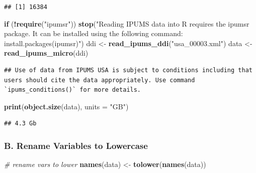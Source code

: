 \documentclass[
]{article}
\newenvironment{Shaded}{\begin{snugshade}}{\end{snugshade}}
\newcommand{\AttributeTok}[1]{\textcolor[rgb]{0.13,0.29,0.53}{#1}}
\newcommand{\CommentTok}[1]{\textcolor[rgb]{0.56,0.35,0.01}{\textit{#1}}}
\newcommand{\ControlFlowTok}[1]{\textcolor[rgb]{0.13,0.29,0.53}{\textbf{#1}}}
\newcommand{\FunctionTok}[1]{\textcolor[rgb]{0.13,0.29,0.53}{\textbf{#1}}}
\newcommand{\NormalTok}[1]{#1}
\newcommand{\OtherTok}[1]{\textcolor[rgb]{0.56,0.35,0.01}{#1}}
\newcommand{\SpecialCharTok}[1]{\textcolor[rgb]{0.81,0.36,0.00}{\textbf{#1}}}
\newcommand{\StringTok}[1]{\textcolor[rgb]{0.31,0.60,0.02}{#1}}
\begin{document}
\begin{verbatim}
## [1] 16384
\end{verbatim}

\begin{Shaded}
\begin{Highlighting}[]
\ControlFlowTok{if}\NormalTok{ (}\SpecialCharTok{!}\FunctionTok{require}\NormalTok{(}\StringTok{"ipumsr"}\NormalTok{)) }\FunctionTok{stop}\NormalTok{(}\StringTok{"Reading IPUMS data into R requires the ipumsr package. It can be installed using the following command: install.packages(\textquotesingle{}ipumsr\textquotesingle{})"}\NormalTok{)}
\NormalTok{ddi }\OtherTok{\textless{}{-}} \FunctionTok{read\_ipums\_ddi}\NormalTok{(}\StringTok{"usa\_00003.xml"}\NormalTok{)}
\NormalTok{data }\OtherTok{\textless{}{-}} \FunctionTok{read\_ipums\_micro}\NormalTok{(ddi)}
\end{Highlighting}
\end{Shaded}

\begin{verbatim}
## Use of data from IPUMS USA is subject to conditions including that users should cite the data appropriately. Use command `ipums_conditions()` for more details.
\end{verbatim}

\begin{Shaded}
\begin{Highlighting}[]
\FunctionTok{print}\NormalTok{(}\FunctionTok{object.size}\NormalTok{(data), }\AttributeTok{units =} \StringTok{"GB"}\NormalTok{)}
\end{Highlighting}
\end{Shaded}

\begin{verbatim}
## 4.3 Gb
\end{verbatim}

\subsubsection{B. Rename Variables to
Lowercase}\label{b.-rename-variables-to-lowercase}

\begin{Shaded}
\begin{Highlighting}[]
\CommentTok{\# rename vars to lower}
\FunctionTok{names}\NormalTok{(data) }\OtherTok{\textless{}{-}} \FunctionTok{tolower}\NormalTok{(}\FunctionTok{names}\NormalTok{(data))}
\end{Highlighting}
\end{Shaded}
\end{document}
